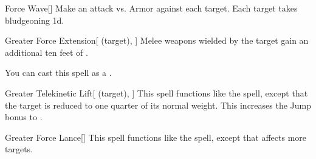 \lowercase{\hypertarget{spell:Force Wave}{}}\label{spell:Force Wave}
\begin{freeability}[Rank 4]{\hypertarget{spell:Force Wave}{Force Wave}}[]
Make an attack vs. Armor against each target.
\hit Each target takes bludgeoning  \plus1d.
\end{freeability}
\vspace{0.25em}



\lowercase{\hypertarget{spell:Greater Force Extension}{}}\label{spell:Greater Force Extension}
\begin{attuneability}[Rank 4]{\hypertarget{spell:Greater Force Extension}{Greater Force Extension}}[ (target), ]
Melee weapons wielded by the target gain an additional ten feet of .

You can cast this spell as a .
\end{attuneability}
\vspace{0.25em}



\lowercase{\hypertarget{spell:Greater Telekinetic Lift}{}}\label{spell:Greater Telekinetic Lift}
\begin{attuneability}[Rank 4]{\hypertarget{spell:Greater Telekinetic Lift}{Greater Telekinetic Lift}}[ (target), ]
This spell functions like the  spell, except that the target is reduced to one quarter of its normal weight.
This increases the Jump bonus to .
\end{attuneability}
\vspace{0.25em}



\lowercase{\hypertarget{spell:Greater Force Lance}{}}\label{spell:Greater Force Lance}
\begin{freeability}[Rank 5]{\hypertarget{spell:Greater Force Lance}{Greater Force Lance}}[]
This spell functions like the  spell, except that affects more targets.
\end{freeability}
\vspace{0.25em}



